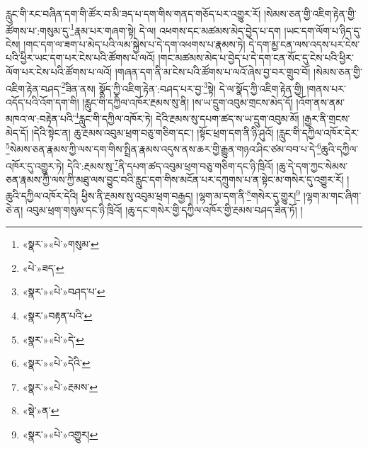 རླུང་གི་རང་བཞིན་དག་གི་ཚོར་བ་མི་ཟད་པ་དག་གིས་གནད་གཅོད་པར་འགྱུར་རོ། །སེམས་ཅན་གྱི་འཇིག་རྟེན་གྱི་ཚོགས་པ་:གསུམ་དུ་\footnote{«སྣར་»«པེ་»གསུམ་}རྣམ་པར་གཞག་སྟེ། དེ་ལ། འཕགས་དང་མཚམས་མེད་བྱེད་པ་དག །ཡང་དག་ལོག་པ་ཉིད་དུ་ངེས། །གང་དག་ལ་ཟག་པ་མེད་པའི་ལམ་སྐྱེས་པ་དེ་དག་འཕགས་པ་རྣམས་ཏེ། དེ་དག་མྱ་ངན་ལས་འདས་པར་ངེས་པའི་ཕྱིར་ཡང་དག་པར་ངེས་པའི་ཚོགས་པ་ལའོ། །གང་མཚམས་མེད་པ་བྱེད་པ་དེ་དག་ངན་སོང་དུ་ངེས་པའི་ཕྱིར་ལོག་པར་ངེས་པའི་ཚོགས་པ་ལའོ། །གཞན་དག་ནི་མ་ངེས་པའི་ཚོགས་པ་ལའོ་ཞེས་བྱ་བར་གྲུབ་བོ། །སེམས་ཅན་གྱི་འཇིག་རྟེན་བཤད་\footnote{«པེ་»ཟད་}ཟིན་ནས། སྣོད་ཀྱི་འཇིག་རྟེན་:བཤད་པར་བྱ་\footnote{«སྣར་»«པེ་»བཤད་པ་}སྟེ། དེ་ལ་སྣོད་ཀྱི་འཇིག་རྟེན་གྱི། །གནས་པར་འདོད་པའི་འོག་དག་གི། །རླུང་གི་དཀྱིལ་འཁོར་རྔམས་སུ་ནི། །ས་ཡ་དྲུག་འབུམ་གྲངས་མེད་དོ། །འོག་ནས་ནམ་མཁའ་ལ་:བརྟེན་པའི་\footnote{«སྣར་»བརྟན་པའི་}རླུང་གི་དཀྱིལ་འཁོར་ཏེ། དེའི་རྔམས་སུ་དཔག་ཚད་ས་ཡ་དྲུག་འབུམ་མོ། །རྒྱར་ནི་གྲངས་མེད་དོ། །དེའི་སྟེང་ན། ཆུ་རྔམས་འབུམ་ཕྲག་བཅུ་གཅིག་དང་། །སྟོང་ཕྲག་དག་ནི་ཉི་ཤུའོ། །རླུང་གི་དཀྱིལ་འཁོར་དེར་\footnote{«སྣར་»«པེ་»དེ་}སེམས་ཅན་རྣམས་ཀྱི་ལས་དག་གིས་སྤྲིན་རྣམས་འདུས་ནས་ཆར་གྱི་རྒྱུན་གཉའ་ཤིང་ཙམ་བབ་པ་དེ་\footnote{«སྣར་»«པེ་»དེའི་}ཆུའི་དཀྱིལ་འཁོར་དུ་འགྱུར་ཏེ། དེའི་:རྔམས་སུ་\footnote{«སྣར་»«པེ་»རྔམས་}ནི་དཔག་ཚད་འབུམ་ཕྲག་བཅུ་གཅིག་དང་ཉི་ཁྲིའོ། །ཆུ་དེ་དག་ཀྱང་སེམས་ཅན་རྣམས་ཀྱི་ལས་ཀྱི་མཐུ་ལས་བྱུང་བའི་རླུང་དག་གིས་མངོན་པར་དཀྲུགས་པ་ན་སྟེང་མ་གསེར་དུ་འགྱུར་རོ། །ཆུའི་དཀྱིལ་འཁོར་དེའི། ཕྱིས་ནི་རྔམས་སུ་འབུམ་ཕྲག་བརྒྱད། །ལྷག་མ་དག་ནི་\footnote{«སྡེ་»ན་}གསེར་དུ་གྱུར།\footnote{«སྣར་»«པེ་»འགྱུར།} །ལྷག་མ་གང་ཞིག་ཅེ་ན། འབུམ་ཕྲག་གསུམ་དང་ཉི་ཁྲིའོ། །ཆུ་དང་གསེར་གྱི་དཀྱིལ་འཁོར་གྱི་རྔམས་བཤད་ཟིན་ཏོ། །
